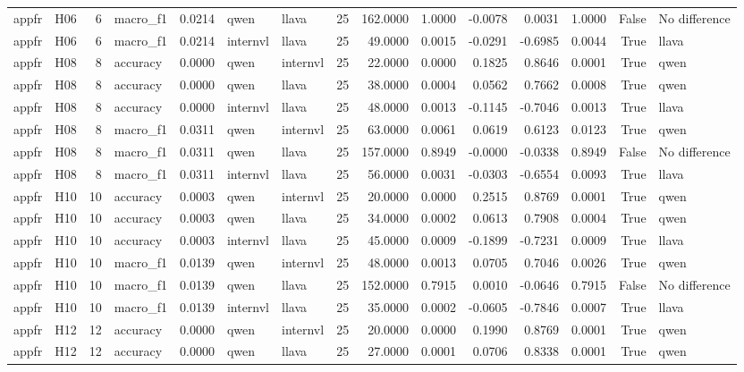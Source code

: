 \begin{table}[tbp]
\begin{tabular}{llrlrllrrrrrrrl}
appfr & H06 & 6 & macro\_f1 & 0.0214 & qwen & llava & 25 & 162.0000 & 1.0000 & -0.0078 & 0.0031 & 1.0000 & False & No difference \\
appfr & H06 & 6 & macro\_f1 & 0.0214 & internvl & llava & 25 & 49.0000 & 0.0015 & -0.0291 & -0.6985 & 0.0044 & True & llava \\
appfr & H08 & 8 & accuracy & 0.0000 & qwen & internvl & 25 & 22.0000 & 0.0000 & 0.1825 & 0.8646 & 0.0001 & True & qwen \\
appfr & H08 & 8 & accuracy & 0.0000 & qwen & llava & 25 & 38.0000 & 0.0004 & 0.0562 & 0.7662 & 0.0008 & True & qwen \\
appfr & H08 & 8 & accuracy & 0.0000 & internvl & llava & 25 & 48.0000 & 0.0013 & -0.1145 & -0.7046 & 0.0013 & True & llava \\
appfr & H08 & 8 & macro\_f1 & 0.0311 & qwen & internvl & 25 & 63.0000 & 0.0061 & 0.0619 & 0.6123 & 0.0123 & True & qwen \\
appfr & H08 & 8 & macro\_f1 & 0.0311 & qwen & llava & 25 & 157.0000 & 0.8949 & -0.0000 & -0.0338 & 0.8949 & False & No difference \\
appfr & H08 & 8 & macro\_f1 & 0.0311 & internvl & llava & 25 & 56.0000 & 0.0031 & -0.0303 & -0.6554 & 0.0093 & True & llava \\
appfr & H10 & 10 & accuracy & 0.0003 & qwen & internvl & 25 & 20.0000 & 0.0000 & 0.2515 & 0.8769 & 0.0001 & True & qwen \\
appfr & H10 & 10 & accuracy & 0.0003 & qwen & llava & 25 & 34.0000 & 0.0002 & 0.0613 & 0.7908 & 0.0004 & True & qwen \\
appfr & H10 & 10 & accuracy & 0.0003 & internvl & llava & 25 & 45.0000 & 0.0009 & -0.1899 & -0.7231 & 0.0009 & True & llava \\
appfr & H10 & 10 & macro\_f1 & 0.0139 & qwen & internvl & 25 & 48.0000 & 0.0013 & 0.0705 & 0.7046 & 0.0026 & True & qwen \\
appfr & H10 & 10 & macro\_f1 & 0.0139 & qwen & llava & 25 & 152.0000 & 0.7915 & 0.0010 & -0.0646 & 0.7915 & False & No difference \\
appfr & H10 & 10 & macro\_f1 & 0.0139 & internvl & llava & 25 & 35.0000 & 0.0002 & -0.0605 & -0.7846 & 0.0007 & True & llava \\
appfr & H12 & 12 & accuracy & 0.0000 & qwen & internvl & 25 & 20.0000 & 0.0000 & 0.1990 & 0.8769 & 0.0001 & True & qwen \\
appfr & H12 & 12 & accuracy & 0.0000 & qwen & llava & 25 & 27.0000 & 0.0001 & 0.0706 & 0.8338 & 0.0001 & True & qwen \\

\end{tabular}
\end{table}
